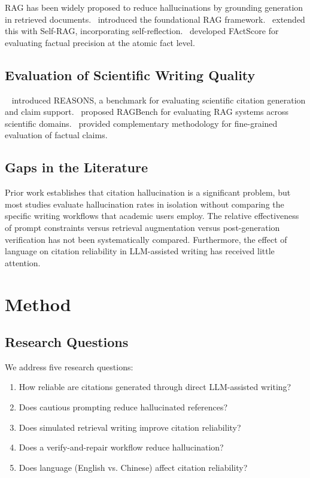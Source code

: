 \documentclass[11pt,a4paper]{article}
\begin{document}
RAG has been widely proposed to reduce hallucinations by grounding generation in retrieved documents.~\cite{lewis2020rag} introduced the foundational RAG framework.~\cite{asai2023selfrag} extended this with Self-RAG, incorporating self-reflection.~\cite{min2023factscore} developed FActScore for evaluating factual precision at the atomic fact level.

\subsection{Evaluation of Scientific Writing Quality}

~\cite{tilwani2024reasons} introduced REASONS, a benchmark for evaluating scientific citation generation and claim support.~\cite{friel2024ragbench} proposed RAGBench for evaluating RAG systems across scientific domains.~\cite{min2023factscore} provided complementary methodology for fine-grained evaluation of factual claims.

\subsection{Gaps in the Literature}

Prior work establishes that citation hallucination is a significant problem, but most studies evaluate hallucination rates in isolation without comparing the specific writing workflows that academic users employ. The relative effectiveness of prompt constraints versus retrieval augmentation versus post-generation verification has not been systematically compared. Furthermore, the effect of language on citation reliability in LLM-assisted writing has received little attention.

\section{Method}
\label{sec:method}

\subsection{Research Questions}

We address five research questions:

\begin{enumerate}[nosep]
    \item How reliable are citations generated through direct LLM-assisted writing?
    \item Does cautious prompting reduce hallucinated references?
    \item Does simulated retrieval writing improve citation reliability?
    \item Does a verify-and-repair workflow reduce hallucination?
    \item Does language (English vs. Chinese) affect citation reliability?
\end{enumerate}
\end{document}
